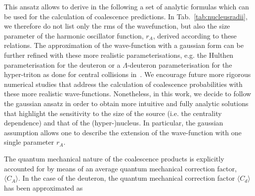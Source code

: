 \documentclass[a4paper,11pt]{scrartcl}
\begin{document}
This ansatz allows to derive in the following a set of analytic formulas which can be used for the calculation of coalescence predictions. In Tab.~\ref{tab:nucleusradii}, we therefore do not list only the rms of the wavefunction, but also the size parameter of the harmonic oscillator function, $r_{A}$, derived according to these relations. The approximation of the wave-function with a gaussian form can be further refined with these more realistic parameterisations, e.g. the Hulthen parameterisation for the deuteron \cite{Nagle:1996vp} or a $\Lambda$-deuteron parameterisation for the hyper-triton as done for central collisions in~\cite{Zhang:2018euf}. We encourage future more rigorous numerical studies that address the calculation of coalescence probabilities with these more realistic wave-functions. Nonetheless, in this work, we decide to follow the gaussian ansatz in order to obtain more intuitive and fully analytic solutions that highlight the sensitivity to the size of the source (i.e. the centrality dependence) and that of the (hyper-)nucleus. In particular, the gaussian assumption allows one to describe the extension of the wave-function with one single parameter $r_{A}$.

The quantum mechanical nature of the coalescence products is explicitly accounted for by means of an average quantum mechanical correction factor, $\langle C_{A} \rangle$. In the case of the deuteron, the quantum mechanical correction factor $\langle C_{d} \rangle$ has been approximated as 
\end{document}

